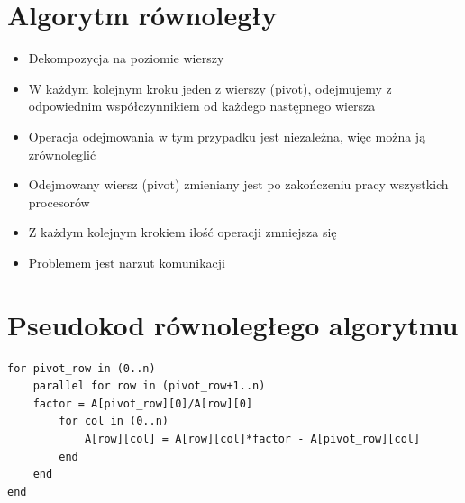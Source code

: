 \documentclass{beamer}
\begin{document}
	\section{Algorytm równoległy}
	\begin{frame}
		\begin{itemize}
			\item Dekompozycja na poziomie wierszy
			\item W każdym kolejnym kroku jeden z wierszy (pivot), odejmujemy z odpowiednim współczynnikiem od każdego następnego wiersza
			\item Operacja odejmowania w tym przypadku jest niezależna, więc można ją zrównoleglić
			\item Odejmowany wiersz (pivot) zmieniany jest po zakończeniu pracy wszystkich procesorów
			\item Z każdym kolejnym krokiem ilość operacji zmniejsza się
			\item Problemem jest narzut komunikacji
		\end{itemize}
	\end{frame}
	
	\section{Pseudokod równoległego algorytmu}
	\begin{frame}[fragile]	

\begin{semiverbatim}
\scriptsize
\begin{lstlisting}
for pivot_row in (0..n)
    parallel for row in (pivot_row+1..n)
    factor = A[pivot_row][0]/A[row][0]
        for col in (0..n)
            A[row][col] = A[row][col]*factor - A[pivot_row][col]
        end
    end
end
\end{lstlisting}
\end{semiverbatim}
	\end{frame}
	
\end{document}
